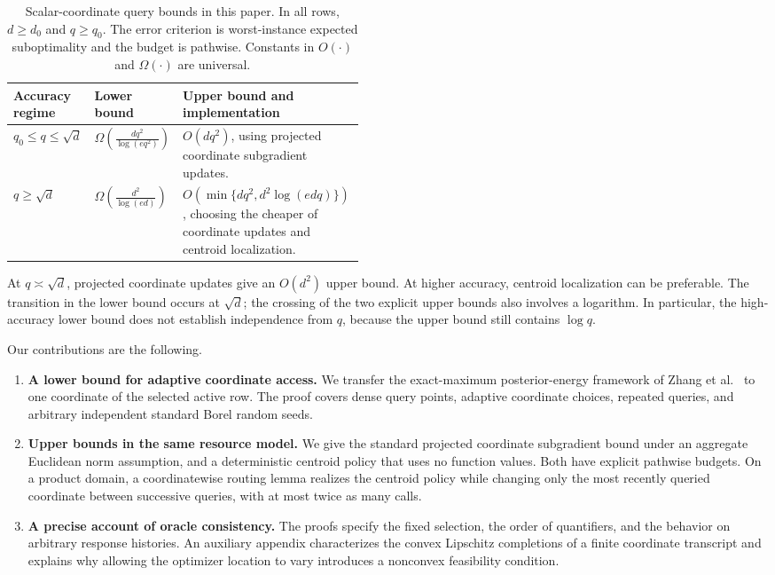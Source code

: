 \documentclass[11pt]{article}
\numberwithin{equation}{section}
\theoremstyle{definition}
\theoremstyle{remark}
\begin{document}
\begin{table}[t]
\centering
\caption{Scalar-coordinate query bounds in this paper. In all rows, $d\ge d_0$ and $q\ge q_0$. The error criterion is worst-instance expected suboptimality and the budget is pathwise. Constants in $O(\cdot)$ and $\Omega(\cdot)$ are universal.}
\label{tab:regimes}
\small
\setlength{\tabcolsep}{5pt}
\renewcommand{\arraystretch}{1.35}
\begin{tabularx}{\linewidth}{@{}L{0.21\linewidth}L{0.25\linewidth}Y@{}}
\toprule
Accuracy regime & Lower bound & Upper bound and implementation \\
\midrule
$q_0\le q\le\sqrt d$
& $\displaystyle\Omega\!\left(\frac{dq^2}{\log(eq^2)}\right)$
& $O(dq^2)$, using projected coordinate subgradient updates. \\
$q\ge\sqrt d$
& $\displaystyle\Omega\!\left(\frac{d^2}{\log(ed)}\right)$
& $O(\min\{dq^2,d^2\log(edq)\})$, choosing the cheaper of coordinate updates and centroid localization. \\
\bottomrule
\end{tabularx}
\end{table}

At $q\asymp\sqrt d$, projected coordinate updates give an $O(d^2)$ upper bound. At higher accuracy, centroid localization can be preferable. The transition in the lower bound occurs at $\sqrt d$; the crossing of the two explicit upper bounds also involves a logarithm. In particular, the high-accuracy lower bound does not establish independence from $q$, because the upper bound still contains $\log q$.

Our contributions are the following.
\begin{enumerate}[leftmargin=*,label=\arabic*.]
\item \textbf{A lower bound for adaptive coordinate access.} We transfer the exact-maximum posterior-energy framework of Zhang et al.\ \cite{ZZQL2026} to one coordinate of the selected active row. The proof covers dense query points, adaptive coordinate choices, repeated queries, and arbitrary independent standard Borel random seeds.
\item \textbf{Upper bounds in the same resource model.} We give the standard projected coordinate subgradient bound under an aggregate Euclidean norm assumption, and a deterministic centroid policy that uses no function values. Both have explicit pathwise budgets. On a product domain, a coordinatewise routing lemma realizes the centroid policy while changing only the most recently queried coordinate between successive queries, with at most twice as many calls.
\item \textbf{A precise account of oracle consistency.} The proofs specify the fixed selection, the order of quantifiers, and the behavior on arbitrary response histories. An auxiliary appendix characterizes the convex Lipschitz completions of a finite coordinate transcript and explains why allowing the optimizer location to vary introduces a nonconvex feasibility condition.
\end{enumerate}
\end{document}
